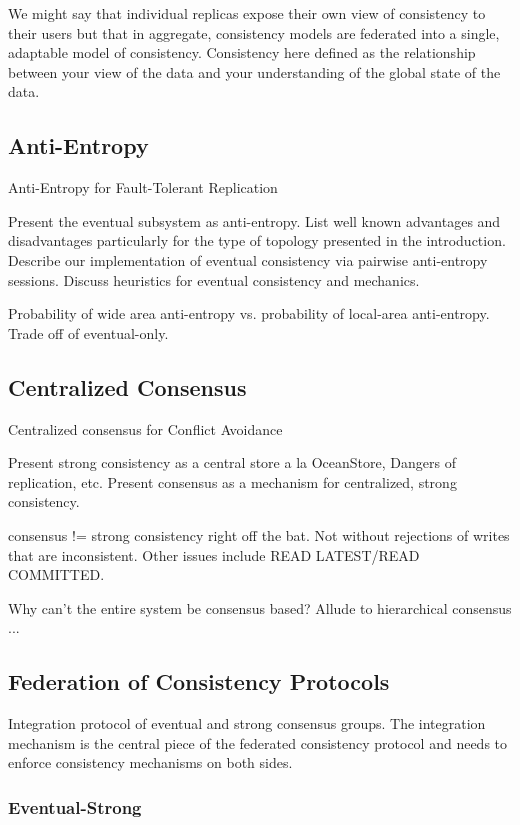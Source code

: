 \documentclass[letterpaper,twocolumn,10pt]{article}
\begin{document}
We might say that individual replicas expose their own view of consistency to their users but that in aggregate, consistency models are federated into a single, adaptable model of consistency. Consistency here defined as the relationship between your view of the data and your understanding of the global state of the data.

\subsection{Anti-Entropy}

Anti-Entropy for Fault-Tolerant Replication

Present the eventual subsystem as anti-entropy. List well known advantages and disadvantages particularly for the type of topology presented in the introduction. Describe our implementation of eventual consistency via pairwise anti-entropy sessions. Discuss heuristics for eventual consistency and mechanics.

Probability of wide area anti-entropy vs. probability of local-area anti-entropy. Trade off of eventual-only.

\subsection{Centralized Consensus}

Centralized consensus for Conflict Avoidance

Present strong consistency as a central store a la OceanStore, Dangers of replication, etc. Present consensus as a mechanism for centralized, strong consistency.

consensus != strong consistency right off the bat. Not without rejections of writes that are inconsistent. Other issues include READ LATEST/READ COMMITTED.

Why can't the entire system be consensus based? Allude to hierarchical consensus ...

\subsection{Federation of Consistency Protocols}

Integration protocol of eventual and strong consensus groups. The integration mechanism is the central piece of the federated consistency protocol and needs to enforce consistency mechanisms on both sides.

\subsubsection{Eventual-Strong}
\end{document}
